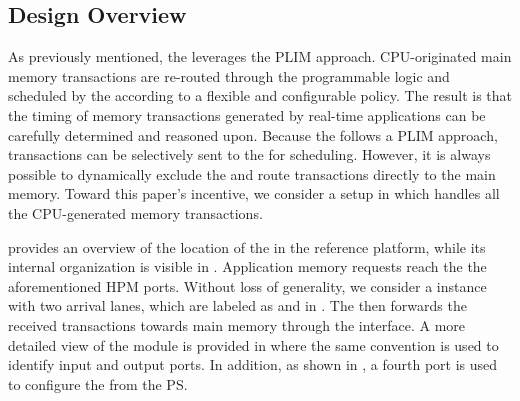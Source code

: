\subsection{Design Overview}
As previously mentioned, the \schim leverages the PLIM
approach. CPU-originated main memory transactions are re-routed
through the programmable logic and scheduled by the \schim according
to a flexible and configurable policy. The result is that the timing
of memory transactions generated by real-time applications can be
carefully determined and reasoned upon. Because the \schim follows a
PLIM approach, transactions can be selectively sent to the \schim for
scheduling. However, it is always possible to dynamically exclude the
\schim and route transactions directly to the main memory. Toward this paper's incentive, we consider a setup in which \schim handles all the CPU-generated memory transactions.


 provides an overview of the location of the
\schim in the reference platform, while its internal organization is
visible in . Application memory
requests reach the \schim the aforementioned HPM ports. Without loss
of generality, we consider a \schim instance with two arrival lanes,
which are labeled as  and  in
. The \schim then forwards the
received transactions towards main memory through the \axiout{}
interface. A more detailed view of the \schim module is provided in
 where the same convention is used to
identify input and output ports. In addition, as shown in
, a fourth \axiconf{} port is used to
configure the \schim from the PS.

